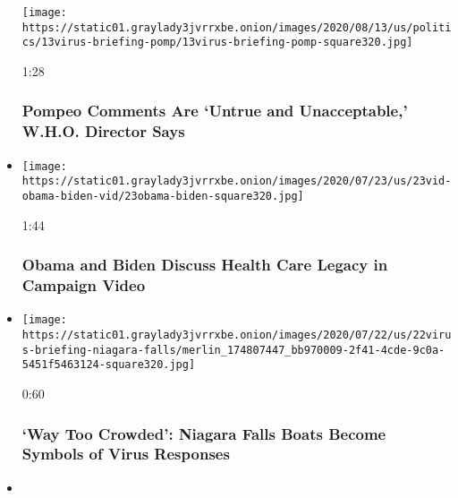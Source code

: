 \begin{itemize}
  \texttt{[image: https://static01.graylady3jvrrxbe.onion/images/2020/08/13/us/politics/13virus-briefing-pomp/13virus-briefing-pomp-square320.jpg]}

  1:28

  \hypertarget{pompeo-comments-are-untrue-and-unacceptable-who-director-says}{%
  \subsubsection{Pompeo Comments Are `Untrue and Unacceptable,' W.H.O.
  Director
  Says}\label{pompeo-comments-are-untrue-and-unacceptable-who-director-says}}
\item
  \href{https://www.nytimes3xbfgragh.onion/video/us/politics/100000007253264/obama-biden-conversation.html?action=click\&module=video-series-bar\&region=header\&pgtype=Article\&playlistId=video/coronavirus-news-update}{}

  \texttt{[image: https://static01.graylady3jvrrxbe.onion/images/2020/07/23/us/23vid-obama-biden-vid/23obama-biden-square320.jpg]}

  1:44

  \hypertarget{obama-and-biden-discuss-health-care-legacy-in-campaign-video}{%
  \subsubsection{Obama and Biden Discuss Health Care Legacy in Campaign
  Video}\label{obama-and-biden-discuss-health-care-legacy-in-campaign-video}}
\item
  \href{https://www.nytimes3xbfgragh.onion/video/world/europe/100000007251464/niagara-falls-tour-boats.html?action=click\&module=video-series-bar\&region=header\&pgtype=Article\&playlistId=video/coronavirus-news-update}{}

  \texttt{[image: https://static01.graylady3jvrrxbe.onion/images/2020/07/22/us/22virus-briefing-niagara-falls/merlin\_174807447\_bb970009-2f41-4cde-9c0a-5451f5463124-square320.jpg]}

  0:60

  \hypertarget{way-too-crowded-niagara-falls-boats-become-symbols-of-virus-responses}{%
  \subsubsection{`Way Too Crowded': Niagara Falls Boats Become Symbols
  of Virus
  Responses}\label{way-too-crowded-niagara-falls-boats-become-symbols-of-virus-responses}}
\item
  \href{https://www.nytimes3xbfgragh.onion/video/us/100000007250068/trump-says-virus-worse-before-better.html?action=click\&module=video-series-bar\&region=header\&pgtype=Article\&playlistId=video/coronavirus-news-update}{}


\end{itemize}
